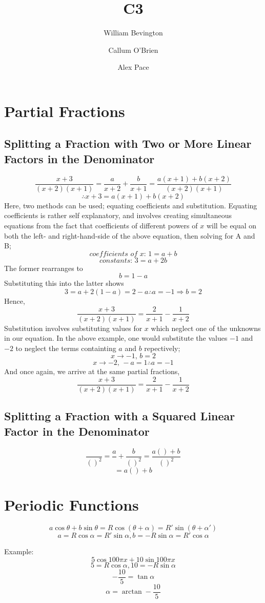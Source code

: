 \documentclass{article}
\title{C3}
\author{William Bevington \and Callum O'Brien \and Alex Pace}
\begin{document}
\maketitle
\tableofcontents
\newpage

\section{Partial Fractions}
\subsection{Splitting a Fraction with Two or More Linear Factors in the Denominator}
\[\frac{x+3}{(x+2)(x+1)}=\frac{a}{x+2}+\frac{b}{x+1}=\frac{a(x+1)+b(x+2)}{(x+2)(x+1)}\]
\[\therefore x+3=a(x+1)+b(x+2)\]
Here, two methods can be used; equating coefficients and substitution. Equating coefficients is rather self explanatory, and involves creating simultaneous equations from the fact that coefficients of different powers of $x$ will be equal on both the left- and right-hand-side of the above equation, then solving for A and B;
\[\textit{coefficients of }x\textit{: }1=a+b\]
\[\textit{constants: }3=a+2b\]
\noindent The former rearranges to
\[b=1-a\]
\noindent Substituting this into the latter shows
\[3=a+2(1-a)=2-a\therefore a=-1\Rightarrow b=2\]
\noindent Hence,
\[\frac{x+3}{(x+2)(x+1)}=\frac{2}{x+1}-\frac{1}{x+2}\]
\noindent Substitution involves substituting values for $x$ which neglect one of the unknowns in our equation. In the above example, one would substitute the values $-1$ and $-2$ to neglect the terms containting $a$ and $b$ repectively;
\[x\rightarrow-1\textit{, }b=2\]
\[x\rightarrow-2\textit{, }-a=1\therefore a=-1\]
And once again, we arrive at the same partial fractions,
\[\frac{x+3}{(x+2)(x+1)}=\frac{2}{x+1}-\frac{1}{x+2}\]

\subsection{Splitting a Fraction with a Squared Linear Factor in the Denominator}
\[\frac{}{()^2}=\frac{a}{}+\frac{b}{()^2}=\frac{a()+b}{()^2}\]
\[=a()+b\]

\section{Periodic Functions}

\[a\cos\theta+b\sin\theta=R\cos(\theta+\alpha)=R'\sin(\theta+\alpha')\]
\[a=R\cos\alpha=R'\sin\alpha,b=-R\sin\alpha=R'\cos\alpha\]

\noindent Example:
\[5\cos100\pi x+10\sin100\pi x\]
\[5=R\cos\alpha,10=-R\sin\alpha\]
\[-\frac{10}{5}=\tan\alpha\]
\[\alpha=\arctan-\frac{10}{5}\]
\end{document}
